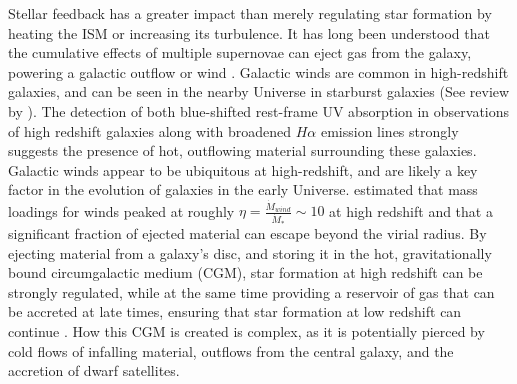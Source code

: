Stellar feedback has a greater impact than merely regulating star formation by
heating the ISM or increasing its turbulence.   It has long been understood that
the cumulative effects of multiple supernovae can eject gas from the galaxy,
powering a galactic outflow or wind \citep{Mathews1971,Larson1974}.  Galactic
winds are common in high-redshift galaxies, and can be seen in the nearby
Universe in starburst galaxies (See review by
\citealt{Veilleux2005}).  The detection of both blue-shifted rest-frame UV
absorption in observations of high redshift galaxies
\citep{Weiner2009,Steidel2010,Martin2012} along with broadened $H\alpha$
emission lines \citep{Heckman1987,Genzel2011,Newman2012} strongly suggests the
presence of hot, outflowing material surrounding these galaxies.  Galactic winds
appear to be ubiquitous at high-redshift, and are likely a key factor in the
evolution of galaxies in the early Universe.  \citet{Muratov2015} estimated that
mass loadings for winds peaked at roughly $\eta=\frac{\dot M_{wind}}{\dot
M_{*}}\sim10$ at high redshift and that a significant
fraction of ejected material can escape beyond the virial radius.  By ejecting
material from a galaxy's disc, and storing it in the hot, gravitationally bound
circumgalactic medium (CGM), star formation at high redshift can be strongly
regulated, while at the same time providing a reservoir of gas that can be
accreted at late times, ensuring that star formation at low redshift can
continue \citep{Marasco2012}.  How this CGM is created is complex, as it is
potentially pierced by cold flows of infalling material, outflows from the
central galaxy, and the accretion of dwarf satellites.

